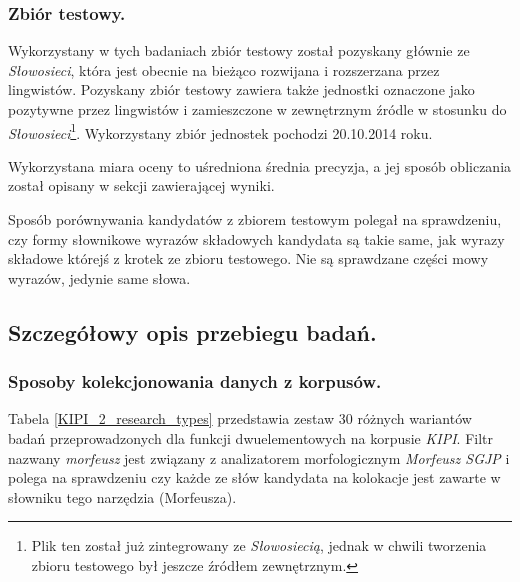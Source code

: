 \documentclass[11pt,a4paper]{llncs}
\begin{document}
\subsubsection{Zbiór testowy.}
Wykorzystany w tych badaniach zbiór testowy został pozyskany głównie ze \emph{Słowosieci}, która jest obecnie na bieżąco rozwijana i rozszerzana przez lingwistów.
Pozyskany zbiór testowy zawiera także jednostki oznaczone jako pozytywne przez lingwistów i zamieszczone w zewnętrznym źródle w stosunku do \emph{Słowosieci}\footnote{Plik ten został już zintegrowany ze \emph{Słowosiecią}, jednak w chwili tworzenia zbioru testowego był jeszcze źródłem zewnętrznym.}.
Wykorzystany zbiór jednostek pochodzi 20.10.2014 roku.

\par
Wykorzystana miara oceny to uśredniona średnia precyzja, a jej sposób obliczania został opisany w sekcji zawierającej wyniki.

\par
Sposób porównywania kandydatów z zbiorem testowym polegał na sprawdzeniu, czy formy słownikowe wyrazów składowych kandydata są takie same, jak wyrazy składowe którejś z krotek ze zbioru testowego.
Nie są sprawdzane części mowy wyrazów, jedynie same słowa.


\subsection{Szczegółowy opis przebiegu badań.}

\subsubsection{Sposoby kolekcjonowania danych z korpusów.}
Tabela \ref{KIPI_2_research_types} przedstawia zestaw 30 różnych wariantów badań przeprowadzonych dla funkcji dwuelementowych na korpusie \emph{KIPI}.
Filtr nazwany \emph{morfeusz} jest związany z analizatorem morfologicznym \emph{Morfeusz SGJP} \cite{morfeusz} i polega na sprawdzeniu czy każde ze słów kandydata na kolokacje jest zawarte w słowniku tego narzędzia (Morfeusza).
\end{document}
